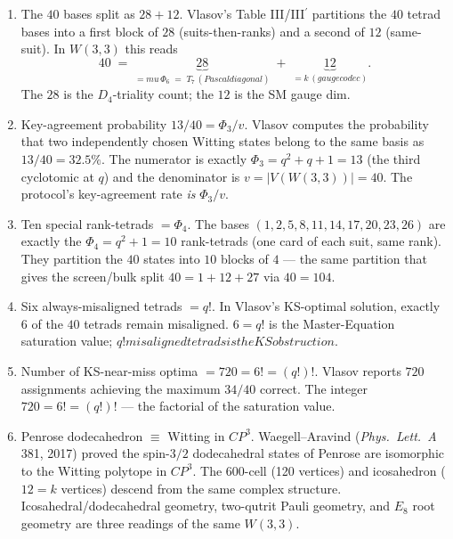 \documentclass[11pt]{article}
\def\mathbb#1{#1}%
\def\textbf#1{#1}%
\def\text#1{#1}%
\def\mu{mu}%
\def\Phi#1{Phi#1}%
\def\cdot{ }%
\begin{document}
\begin{enumerate}[leftmargin=2em]
\item \textbf{The $40$ bases split as $28 + 12$.} Vlasov's Table III/III$^\prime$ partitions the $40$ tetrad bases into a first block of $28$ (suits-then-ranks) and a second of $12$ (same-suit). In $W(3,3)$ this reads
\[
40 \;=\; \underbrace{28}_{= \mu\,\Phi_6\;=\;T_7\,(\text{Pascal diagonal})} \;+\; \underbrace{12}_{= k\,(\text{gauge codec})}.
\]
The $28$ is the $D_4$-triality count; the $12$ is the SM gauge dim.

\item \textbf{Key-agreement probability $13/40 = \Phi_3/v$.} Vlasov computes the probability that two independently chosen Witting states belong to the same basis as $13/40 = 32.5\%$. The numerator is exactly $\Phi_3 = q^2 + q + 1 = 13$ (the third cyclotomic at $q$) and the denominator is $v = |V(W(3,3))| = 40$. The protocol's key-agreement rate \emph{is} $\Phi_3/v$.

\item \textbf{Ten special rank-tetrads $= \Phi_4$.} The bases $(1, 2, 5, 8, 11, 14, 17, 20, 23, 26)$ are exactly the $\Phi_4 = q^2 + 1 = 10$ rank-tetrads (one card of each suit, same rank). They partition the $40$ states into $10$ blocks of $4$ --- the same partition that gives the screen/bulk split $40 = 1 + 12 + 27$ via $40 = 10 \cdot 4$.

\item \textbf{Six always-misaligned tetrads $= q!$.} In Vlasov's KS-optimal solution, exactly $6$ of the $40$ tetrads remain misaligned. $6 = q!$ is the Master-Equation saturation value; $\boxed{q!\text{ misaligned tetrads is the KS obstruction}}$.

\item \textbf{Number of KS-near-miss optima $= 720 = 6! = (q!)!$.} Vlasov reports $720$ assignments achieving the maximum $34/40$ correct. The integer $720 = 6! = (q!)!$ --- the factorial of the saturation value.

\item \textbf{Penrose dodecahedron $\equiv$ Witting in $\mathbb{CP}^3$.} Waegell--Aravind (\emph{Phys.\ Lett.\ A} \textbf{381}, 2017) proved the spin-$3/2$ dodecahedral states of Penrose are isomorphic to the Witting polytope in $\mathbb{CP}^3$. The 600-cell (120 vertices) and icosahedron ($12 = k$ vertices) descend from the same complex structure. \textbf{Icosahedral/dodecahedral geometry, two-qutrit Pauli geometry, and $E_8$ root geometry are three readings of the same $W(3,3)$.}


\end{enumerate}
\end{document}
